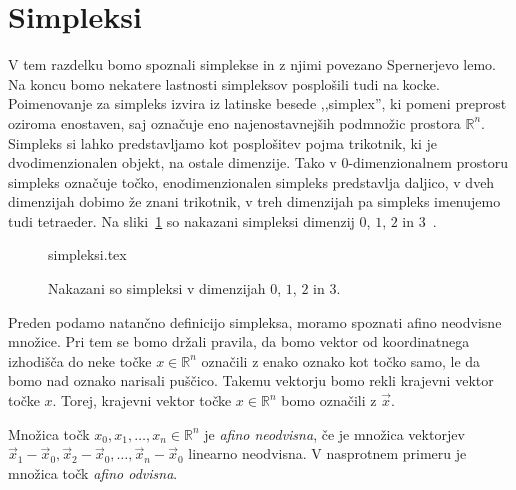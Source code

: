 \documentclass[mat1]{fmfdelo}
\newcommand{\R}{\mathbb R}
\newcommand{\0}{0}
\def\citat#1{,,#1''}
\begin{document}
\section{Simpleksi}\label{raz:simpleksi}
V tem razdelku bomo spoznali simplekse in z njimi povezano Spernerjevo lemo. Na koncu bomo nekatere lastnosti simpleksov posplošili tudi na kocke. Poimenovanje za simpleks izvira iz latinske besede \citat{simplex}, ki pomeni preprost oziroma enostaven, saj označuje eno najenostavnejših podmnožic prostora $\R^n$.  Simpleks si lahko predstavljamo kot posplošitev pojma trikotnik, ki je dvodimenzionalen objekt, na ostale dimenzije. Tako v $0$-dimenzionalnem prostoru simpleks označuje točko, enodimenzionalen simpleks predstavlja daljico, v dveh dimenzijah dobimo že znani trikotnik, v treh dimenzijah pa simpleks imenujemo tudi tetraeder. Na sliki~\ref{fig:simplex} so nakazani simpleksi dimenzij $0$, $1$, $2$ in $3$~\cite{simplex}.
\begin{figure}[h!]  
	\centering
	{simpleksi.tex}%
	\caption{Nakazani so simpleksi v dimenzijah $0$, $1$, $2$ in $3$.}\label{fig:simplex}
\end{figure}
Preden podamo natančno definicijo simpleksa, moramo spoznati afino neodvisne množice. Pri tem se bomo držali pravila, da bomo vektor od koordinatnega izhodišča do neke točke $x \in \R^n$ označili z enako oznako kot točko samo, le da bomo nad oznako narisali puščico. Takemu vektorju bomo rekli krajevni vektor točke $x$. Torej, krajevni vektor točke $x \in \R^n$ bomo označili z $\vec{x}$.
\begin{definicija}
Množica točk $x_0, x_1, \dots , x_n \in \R^n$ je \emph{afino neodvisna}, če je množica vektorjev $\vec{x}_1 - \vec{x}_0, \vec{x}_2 - \vec{x}_0, \dots , \vec{x}_n - \vec{x}_0$ linearno neodvisna. V nasprotnem primeru je množica točk \emph{afino odvisna}.
\end{definicija}
\end{document}
